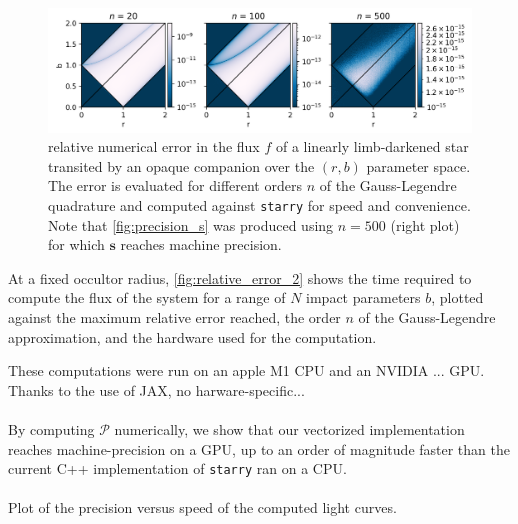 \documentclass[modern]{aastex631}
\begin{document}
\begin{figure}[H]
    \begin{center}
        \includegraphics[width=\textwidth]{../workflows/speed/figures/error_rb.png}
        \caption{relative numerical error in the flux $f$ of a linearly limb-darkened star transited by an opaque companion over the $(r, b)$ parameter space. The error is evaluated for different orders $n$ of the Gauss-Legendre quadrature and computed against \texttt{starry} for speed and convenience. Note that \autoref{fig:precision_s} was produced using $n=500$ (right plot) for which $\bm{s}$ reaches machine precision.}
        \label{fig:relative_error_1}
    \end{center}
\end{figure}
At a fixed occultor radius, \autoref{fig:relative_error_2} shows the time required to compute the flux of the system for a range of $N$ impact parameters $b$, plotted against the maximum relative error reached, the order $n$ of the Gauss-Legendre approximation, and the hardware used for the computation.

These computations were run on an apple M1 CPU and an NVIDIA ... GPU. Thanks to the use of JAX, no harware-specific... \\\\



By computing $\mathcal{P}$ numerically, we show that our vectorized implementation reaches machine-precision on a GPU, up to an order of magnitude faster than the current C++ implementation of \texttt{starry} ran on a CPU.\\\\

Plot of the precision versus speed of the computed light curves.
\end{document}
